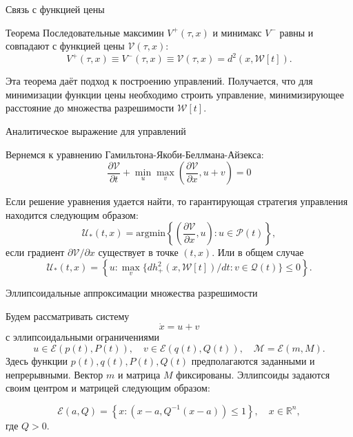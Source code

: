 \documentclass{beamer}
\begin{document}
\begin{frame}{Связь с функцией цены}

\begin{block}{Теорема}
Последовательные максимин \( V^+(\tau, x) \) и минимакс \( V^-\) равны и совпадают с функцией
     цены \( \mathcal{V}(\tau,x) \):
    \[
        V^+(\tau, x) \equiv V^-(\tau, x) \equiv \mathcal{V}(\tau, x) = d^2(x, \mathcal{W}[t]).
    \]
\end{block}

Эта теорема даёт подход к построению управлений. Получается, что для минимизации функции цены необходимо строить управление, минимизирующее расстояние до множества разрешимости \( \mathcal{W}[t] \).

\end{frame}

\begin{frame}{Аналитическое выражение для управлений}


Вернемся к уравнению Гамильтона-Якоби-Беллмана-Айзекса:
\[
        \frac{\partial \mathcal{V}}{\partial t} + \min_u \max_v \left( \frac{\partial \mathcal{V}}
         {\partial x}, u + v \right) = 0
\]

Если решение уравнения удается найти, то гарантирующая стратегия управления находится следующим образом:
\begin{equation*}
    \mathcal{U}_*(t,x) = \mathrm{argmin} \left\{ \left( \frac{\partial \mathcal{V}}{\partial x},
     u \right) : u \in \mathcal{P}(t) \right\},
\end{equation*}
если градиент \( \partial \mathcal{V} / \partial x \) существует в точке \( (t, x) \). Или в общем случае
\begin{equation*}
    \mathcal{U}_*(t,x) = \left\{ u: \max_v \{ dh_+^2(x, \mathcal{W}[t]) / dt : v \in \mathcal{Q}(t) \} 
     \le 0 \right\}.
\end{equation*}
    
\end{frame}

\begin{frame}{Эллипсоидальные аппроксимации множества разрешимости}

Будем рассматривать систему
\begin{equation*}
    \dot{x} = u + v
\end{equation*}
с эллипсоидальными ограничениями
\begin{equation*}
    u \in \mathcal{E}(p(t), P(t)), \quad v \in \mathcal{E}(q(t), Q(t)), \quad \mathcal{M} = 
     \mathcal{E}(m, M).
\end{equation*}
Здесь функции \( p(t), q(t), P(t), Q(t) \) предполагаются заданными и непрерывными. Вектор \( m \) и
 матрица \( M \) фиксированы. Эллипсоиды задаются своим центром и матрицей следующим образом:
 
\begin{equation*}
    \mathcal{E}(a, Q) = \left\{ x : (x - a, Q^{-1}(x - a)) \le 1 \right\}, \quad x \in \mathbb{R}^n,
\end{equation*}
где \( Q > 0 \).
    
\end{frame}
\end{document}
